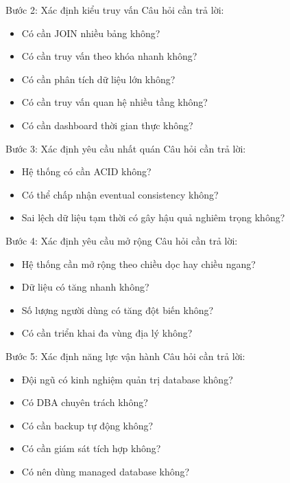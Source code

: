 \documentclass[aspectratio=169,11pt]{beamer}
\newcommand{\smallitem}{\setlength{\itemsep}{2pt}\setlength{\parskip}{0pt}}
\begin{document}
\begin{frame}{Bước 2: Xác định kiểu truy vấn}
Câu hỏi cần trả lời:
\begin{itemize}
  \smallitem
  \item Có cần JOIN nhiều bảng không?
  \item Có cần truy vấn theo khóa nhanh không?
  \item Có cần phân tích dữ liệu lớn không?
  \item Có cần truy vấn quan hệ nhiều tầng không?
  \item Có cần dashboard thời gian thực không?
\end{itemize}
\end{frame}

\begin{frame}{Bước 3: Xác định yêu cầu nhất quán}
Câu hỏi cần trả lời:
\begin{itemize}
  \smallitem
  \item Hệ thống có cần ACID không?
  \item Có thể chấp nhận eventual consistency không?
  \item Sai lệch dữ liệu tạm thời có gây hậu quả nghiêm trọng không?
\end{itemize}
\end{frame}

\begin{frame}{Bước 4: Xác định yêu cầu mở rộng}
Câu hỏi cần trả lời:
\begin{itemize}
  \smallitem
  \item Hệ thống cần mở rộng theo chiều dọc hay chiều ngang?
  \item Dữ liệu có tăng nhanh không?
  \item Số lượng người dùng có tăng đột biến không?
  \item Có cần triển khai đa vùng địa lý không?
\end{itemize}
\end{frame}

\begin{frame}{Bước 5: Xác định năng lực vận hành}
Câu hỏi cần trả lời:
\begin{itemize}
  \smallitem
  \item Đội ngũ có kinh nghiệm quản trị database không?
  \item Có DBA chuyên trách không?
  \item Có cần backup tự động không?
  \item Có cần giám sát tích hợp không?
  \item Có nên dùng managed database không?
\end{itemize}
\end{frame}
\end{document}
